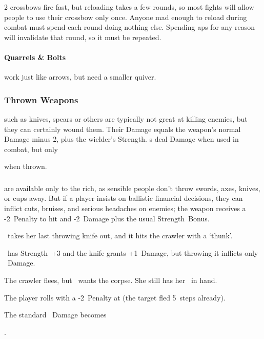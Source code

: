 \begin{multicols}{2}
\Glspl{crossbow} fire fast, but reloading takes a few \glspl{round}, so most fights will allow people to use their \gls{crossbow} only once.
Anyone mad enough to reload  during combat must spend each \gls{round} doing nothing else.
Spending \glspl{ap} for any reason will invalidate that \gls{round}, so it must be repeated.

\paragraph{Quarrels \& Bolts}
work just like arrows, but need a smaller quiver.

\subsubsection{Thrown Weapons}
such as knives, spears or others are typically not great at killing enemies, but they can certainly wound them.
Their Damage equals the \gls{weapon}'s normal Damage minus 2, plus the wielder's Strength.
\javelin\weaponName s deal
 Damage
when used in combat, but only
\addtocounter{weaponDamage}{-2}%
 when thrown.

\subsubsection{}
are available only to the rich, as sensible people don't throw swords, axes, knives, or cups away.
But if a player insists on ballistic financial decisions, they can inflict cuts, bruises, and serious headaches on enemies; the weapon receives a -2~Penalty to hit and -2~Damage plus the usual Strength~Bonus.

\begin{exampletext}
  \composeHumanName\ takes her last throwing knife out, and it hits the \gls{crawler} with a `thunk'.

  {\sffamily
    \currentName\ has Strength~+3 and the knife grants +1~Damage, but throwing it inflicts only ~Damage.
  }

  The \gls{crawler} flees, but \currentName\ wants the corpse.
  She still has her \longsword\weaponName\ in hand.

  {\sffamily
    The player rolls  with a -2~Penalty at \tn[8] (the target fled 5~\glspl{step} already).
    \addtocounter{weaponDamage}{3}%
    The standard ~Damage becomes
    \addtocounter{weaponDamage}{-2}%
    .
  }
\end{exampletext}

\end{multicols}

